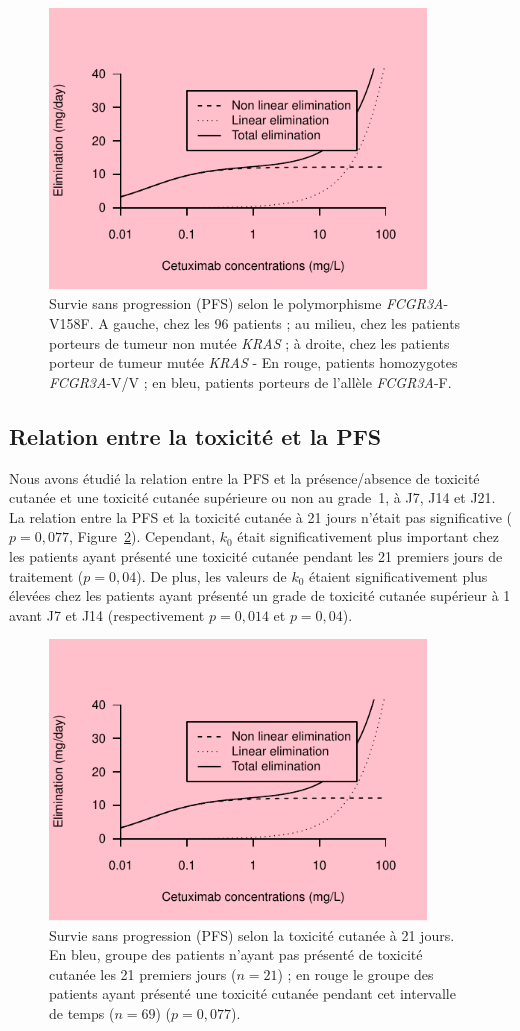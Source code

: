 \begin{figure}[htbp]
	\centering
		\includegraphics[width=10cm]{images/essai001.pdf}
	\caption{Survie sans progression (PFS) selon le polymorphisme \textit{FCGR3A}-V158F. A gauche, chez les 96 patients ; au milieu, chez les patients porteurs de tumeur non mutée \textit{KRAS} ; à droite, chez les patients porteur de tumeur mutée \textit{KRAS} - En rouge, patients homozygotes \textit{FCGR3A}-V/V ; en bleu, patients porteurs de l'allèle \textit{FCGR3A}-F.}
	\label{fig:27}
\end{figure}
\subsection{Relation entre la toxicité et la PFS}
Nous avons étudié la relation entre la PFS et la présence/absence de toxicité cutanée et une toxicité cutanée supérieure ou non au grade~1, à J7, J14 et J21. La relation entre la PFS et la toxicité cutanée à 21 jours n'était pas significative ($p = 0,077$, Figure~\ref{fig:28}).
Cependant, $k_0$ était significativement plus important chez les patients ayant présenté une toxicité cutanée pendant les 21 premiers jours de traitement ($p = 0,04$). De plus, les valeurs de $k_0$ étaient significativement plus élevées chez les patients ayant présenté un grade de toxicité cutanée supérieur à 1 avant J7 et J14 (respectivement $p = 0,014$ et $p = 0,04$).
\begin{figure}[htbp]
	\centering
		\includegraphics[width=10cm]{images/essai001.pdf}
	\caption{Survie sans progression (PFS) selon la toxicité cutanée à 21 jours. En bleu, groupe des patients n'ayant pas présenté de toxicité cutanée les 21 premiers jours ($n = 21$) ; en rouge le groupe des patients ayant présenté une toxicité cutanée pendant cet intervalle de temps ($n = 69$) ($p = 0,077$).}
	\label{fig:28}
\end{figure}
